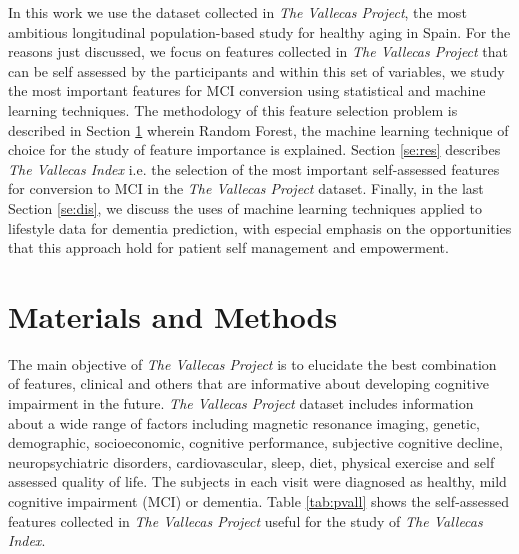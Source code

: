 \documentclass[preprint,12pt]{elsarticle}
\begin{document}
In this work we use the dataset collected in \emph{The Vallecas Project}, the most ambitious longitudinal population-based study for healthy aging in Spain. For the reasons just discussed, we focus on features collected in \emph{The Vallecas Project} that can be self assessed by the participants and within this set of variables, we study the most important features for MCI conversion using statistical and machine learning techniques. 
The methodology of this feature selection problem is described in Section \ref{se:mandm} wherein Random Forest, the machine learning technique of choice for the study of feature importance is explained.
Section \ref{se:res} describes \emph{The Vallecas Index} i.e. the selection of the most important self-assessed features for conversion to MCI in the \emph{The Vallecas Project} dataset. Finally, in the last Section \ref{se:dis}, we discuss the uses of machine learning techniques applied to lifestyle data for dementia prediction, with especial emphasis on the opportunities that this approach hold for patient self management and empowerment. 

\section{Materials and Methods}
\label{se:mandm}

The main objective of \emph{The Vallecas Project} is to elucidate the best combination of features, clinical and others that are informative about developing cognitive impairment in the future.
\emph{The Vallecas Project} dataset includes information about a wide range of factors including magnetic resonance imaging, genetic, demographic, socioeconomic, cognitive performance, subjective cognitive decline, neuropsychiatric disorders, cardiovascular, sleep, diet, physical exercise and self assessed quality of life. The subjects in each visit were diagnosed as healthy, mild cognitive impairment (MCI) or dementia.
Table \ref{tab:pvall} shows the self-assessed features collected in \emph{The Vallecas Project} useful for the study of \emph{The Vallecas Index}.

\end{document}
